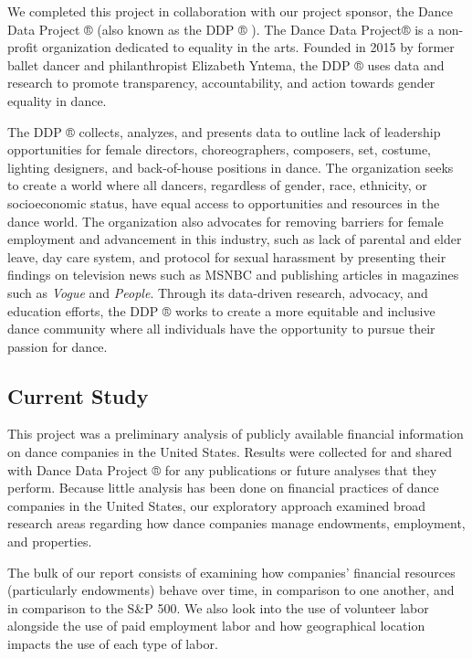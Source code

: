 \documentclass[Dance Data
Project,article,submit,moreauthors,pdftex]{mdpi}
\begin{document}
We completed this project in collaboration with our project sponsor, the
Dance Data Project ® (also known as the DDP ® ). The Dance Data Project®
is a non-profit organization dedicated to equality in the arts. Founded
in 2015 by former ballet dancer and philanthropist Elizabeth Yntema, the
DDP ® uses data and research to promote transparency, accountability,
and action towards gender equality in dance.

The DDP ® collects, analyzes, and presents data to outline lack of
leadership opportunities for female directors, choreographers,
composers, set, costume, lighting designers, and back-of-house positions
in dance. The organization seeks to create a world where all dancers,
regardless of gender, race, ethnicity, or socioeconomic status, have
equal access to opportunities and resources in the dance world. The
organization also advocates for removing barriers for female employment
and advancement in this industry, such as lack of parental and elder
leave, day care system, and protocol for sexual harassment by presenting
their findings on television news such as MSNBC and publishing articles
in magazines such as \emph{Vogue} and \emph{People}. Through its
data-driven research, advocacy, and education efforts, the DDP ® works
to create a more equitable and inclusive dance community where all
individuals have the opportunity to pursue their passion for dance.

\hypertarget{current-study}{%
\subsection{Current Study}\label{current-study}}

This project was a preliminary analysis of publicly available financial
information on dance companies in the United States. Results were
collected for and shared with Dance Data Project ® for any publications
or future analyses that they perform. Because little analysis has been
done on financial practices of dance companies in the United States, our
exploratory approach examined broad research areas regarding how dance
companies manage endowments, employment, and properties.

The bulk of our report consists of examining how companies' financial
resources (particularly endowments) behave over time, in comparison to
one another, and in comparison to the S\&P 500. We also look into the
use of volunteer labor alongside the use of paid employment labor and
how geographical location impacts the use of each type of labor.
\end{document}
